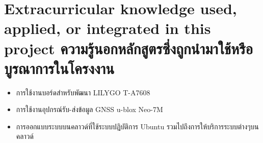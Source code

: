 \section{\ifenglish%
Extracurricular knowledge used, applied, or integrated in this project
\else%
ความรู้นอกหลักสูตรซึ่งถูกนำมาใช้หรือบูรณาการในโครงงาน
\fi
}

\begin{itemize}
  \item การใช้งานบอร์ดสำหรับพัฒนา LILYGO T-A7608
  \item การใช้งานอุปกรณ์รับ-ส่งข้อมูล GNSS u-blox Neo-7M
  \item การออกแบบระบบบนคลาวด์ที่ใช้ระบบปฏิบัติการ Ubuntu รวมไปถึงการให้บริการระบบต่างๆบนคลาวด์
\end{itemize}
